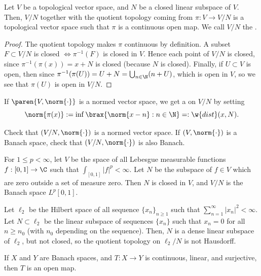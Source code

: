 \documentclass[11pt]{report}
\begin{document}
\begin{defn}
Let $V$ be a topological vector space, and $N$ be a closed linear subspace of $V$. Then, $V/N$ together with the quotient topology coming from $\pi:V \to V/N$ is a topological vector space such that $\pi$ is a continuous open map. We call $V/N$ the .
\end{defn}

\begin{proof}
The quotient topology makes $\pi$ continuous by definition. A subset $F \subset V/N$ is closed $\iff \pi^{-1}(F)$ is closed in $V$. Hence each point of $V/N$ is closed, since $\pi^{-1}(\pi(x))=x+N$ is closed (because $N$ is closed). Finally, if $U \subset V$ is open, then since $\pi^{-1}(\pi(U))=U+N=\bigcup_{n \in \N}(n+U)$, which is open in $V$, so we see that $\pi(U)$ is open in $V/N$.
\end{proof}

\begin{defn}
If $\paren{V,\norm{\cdot}}$ is a normed vector space, we get a  on $V/N$ by setting
\[
\norm{\pi(x)}:= \inf \brax{ \norm{x-n}:n\in \N }=:\w{dist}(x,N).
\]
\end{defn}

\begin{exercise}
Check that $(V/N,\norm{\cdot})$ is a normed vector space. If $(V,\norm{\cdot})$ is a Banach space, check that $(V/N,\norm{\cdot})$ is also Banach.
\end{exercise}

\begin{ex}
For $1 \leq p < \infty$, let $V$ be the space of all Lebesgue measurable functions $f:[0,1]\to \C$ such that $\int_{[0,1]}|f|^p < \infty$. Let $N$ be the subspace of $f \in V$ which are zero outside a set of measure zero. Then $N$ is closed in $V$, and $V/N$ is the Banach space $L^p[0,1]$.
\end{ex}

\begin{ex}
Let $\ell_2$ be the Hilbert space of all sequence $\{x_n\}_{n \geq 1}$ such that $\sum_{n=1}^\infty |x_n|^2 < \infty$. Let $N \subset \ell_2$ be the linear subspace of sequences $\{x_n\}$ such that $x_n=0$ for all $n \geq n_0$ (with $n_0$ depending on the sequence). Then, $N$ is a dense linear subspace of $\ell_2$, but not closed, so the quotient topology on $\ell_2/N$ is not Hausdorff.
\end{ex}

\begin{thm} \label{thm:open-mapping-thm}
If $X$ and $Y$ are Banach spaces, and $T:X \to Y$ is continuous, linear, and surjective, then $T$ is an open map.
\end{thm}
\end{document}
